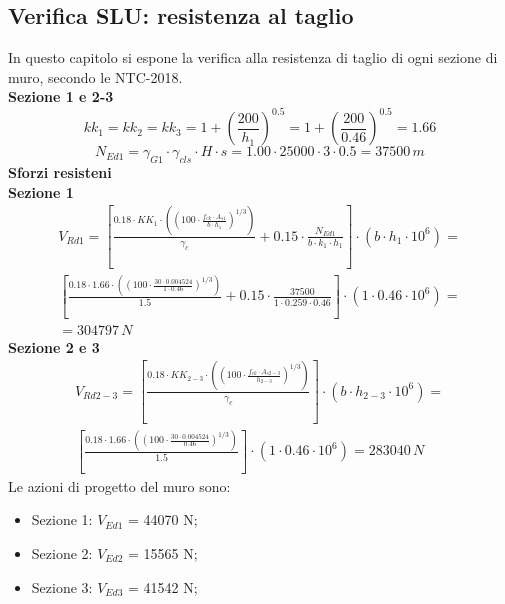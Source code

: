 \subsection{Verifica SLU: resistenza al taglio}
In questo capitolo si espone la verifica alla resistenza di taglio di ogni sezione di muro, secondo le NTC-2018.\\
\textbf{Sezione 1 e 2-3}
\begin{equation*}
    kk_1 = kk_2 = kk_3 = 1 + \left(\frac{200}{h_1}\right)^{0.5} = 1 + \left(\frac{200}{0.46}\right)^{0.5} = 1.66
\end{equation*}
\begin{equation*}
    N_{Ed1} = \gamma_{G1} \cdot \gamma_{cls} \cdot H \cdot s = 1.00 \cdot 25000 \cdot 3 \cdot 0.5 = 37500 \,m
\end{equation*}
\textbf{Sforzi resisteni}\\
\textbf{Sezione 1}
\begin{equation*}
    \begin{split}
    V_{Rd1} = \left[ \frac{0.18 \cdot KK_1 \cdot \left(\left(100 \cdot \frac{f_{ck} \cdot A_{s1}}{b \cdot h_1}\right)^{1/3}\right)}{\gamma_c} +0.15 \cdot \frac{N_{Ed1}}{b \cdot k_1 \cdot h_1}\right] \cdot \left(b \cdot h_1 \cdot 10^6\right)=\\
    \left[ \frac{0.18 \cdot 1.66 \cdot \left(\left(100 \cdot \frac{30 \cdot 0.004524}{1 \cdot 0.46}\right)^{1/3}\right)}{1.5} +0.15 \cdot \frac{37500}{1 \cdot 0.259 \cdot 0.46}\right] \cdot \left(1 \cdot 0.46 \cdot 10^6\right)=\\
     = 304797 \,N
    \end{split}
\end{equation*}
\noindent
\textbf{Sezione 2 e 3}
\begin{equation*}
    \begin{split}
        V_{Rd2-3} = \left[ \frac{0.18 \cdot KK_{2-3} \cdot \left(\left(100 \cdot \frac{f_{ck} \cdot A_{s2-3}}{h_{2-3}}\right)^{1/3}\right)}{\gamma_c}\right] \cdot (b \cdot h_{2-3} \cdot 10^6) =\\
        \left[ \frac{0.18 \cdot 1.66 \cdot \left(\left(100 \cdot \frac{30 \cdot 0.004524}{0.46}\right)^{1/3}\right)}{1.5}\right] \cdot (1 \cdot 0.46 \cdot 10^6) =  283040 \,N
    \end{split}
\end{equation*}
Le azioni di progetto del muro sono:
\begin{itemize}
    \item Sezione 1: $V_{Ed1}$ = 44070 N;
    \item Sezione 2: $V_{Ed2}$ = 15565 N;
    \item Sezione 3: $V_{Ed3}$ = 41542 N;
\end{itemize}


